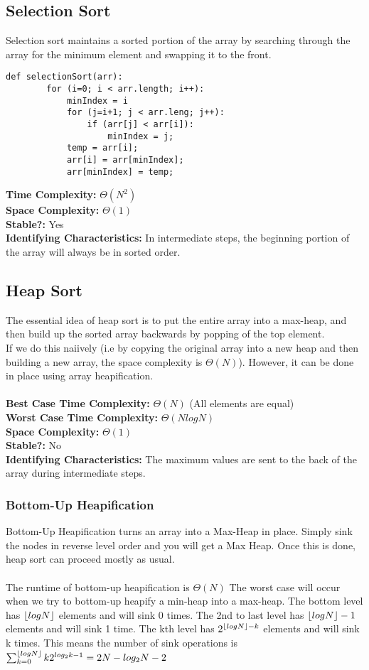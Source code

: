 \documentclass{article}
\DeclarePairedDelimiter\floor{\lfloor}{\rfloor}
\begin{document}
\subsection{Selection Sort}
Selection sort maintains a sorted portion of the array by searching through the array for the minimum element and swapping it to the front.
\begin{lstlisting}[]
    def selectionSort(arr):
        for (i=0; i < arr.length; i++):
            minIndex = i
            for (j=i+1; j < arr.leng; j++):
                if (arr[j] < arr[i]):
                    minIndex = j;
            temp = arr[i];
            arr[i] = arr[minIndex];
            arr[minIndex] = temp;
\end{lstlisting}
\textbf{Time Complexity: } $\Theta(N^2)$\\
\textbf{Space Complexity: } $\Theta(1)$\\
\textbf{Stable?: } Yes\\
\textbf{Identifying Characteristics: } In intermediate steps, the beginning portion of the array will always be in sorted order. 
\subsection{Heap Sort}
The essential idea of heap sort is to put the entire array into a max-heap, and then build up the sorted array backwards by popping of the top element.\\
If we do this naiively (i.e by copying the original array into a new heap and then building a new array, the space complexity is $\Theta(N)$). However, it can be done in place
using array heapification.\\\\
\textbf{Best Case Time Complexity: }$\Theta(N)$ (All elements are equal)\\
\textbf{Worst Case Time Complexity: }$\Theta(NlogN)$\\
\textbf{Space Complexity: }$\Theta(1)$\\
\textbf{Stable?: }No\\
\textbf{Identifying Characteristics: }The maximum values are sent to the back of the array during intermediate steps.
\subsubsection{Bottom-Up Heapification}
Bottom-Up Heapification turns an array into a Max-Heap in place.
Simply sink the nodes in reverse level order and you will get a Max Heap.
Once this is done, heap sort can proceed mostly as usual.\\\\
The runtime of bottom-up heapification is $\Theta(N)$
The worst case will occur when we try to bottom-up heapify a min-heap into a max-heap.
The bottom level has $\floor{logN}$ elements and will sink 0 times.
The 2nd to last level has $\floor{logN} - 1$ elements and will sink 1 time.
The kth level has $2^{\floor{logN}-k}$ elements and will sink k times.
This means the number of sink operations is $\sum_{k=0}^{\floor{logN}}{k2^{log_2k-1}} = 2N - log_2N - 2$ 
\end{document}

